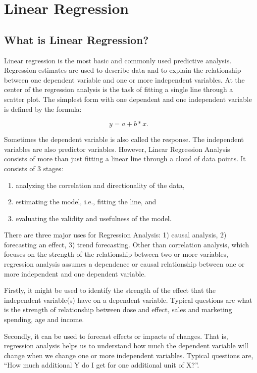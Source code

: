 \documentclass{article}\usepackage[]{graphicx}\usepackage[]{color}
\begin{document}
\section{Linear Regression}

\subsection{What is Linear Regression?}

Linear regression is the most basic and commonly used predictive analysis.  Regression estimates are used to describe data and to explain the relationship between one dependent variable and one or more independent variables.  At the center of the regression analysis is the task of fitting a single line through a scatter plot.  The simplest form with one dependent and one independent variable is defined by the formula:

\begin{equation}
y = a + b*x.
\end{equation}

Sometimes the dependent variable is also called the response.  The independent variables are also predictor variables.  However, Linear Regression Analysis consists of more than just fitting a linear line through a cloud of data points.  It consists of 3 stages:

\begin{enumerate}
  \item analyzing the correlation and directionality of the data, 
  \item estimating the model, i.e., fitting the line, and 
  \item evaluating the validity and usefulness of the model.
\end{enumerate}

There are three major uses for Regression Analysis: 1) causal analysis, 2) forecasting an effect, 3) trend forecasting.  Other than correlation analysis, which focuses on the strength of the relationship between two or more variables, regression analysis assumes a dependence or causal relationship between one or more independent and one dependent variable.

Firstly, it might be used to identify the strength of the effect that the independent variable(s) have on a dependent variable.  Typical questions are what is the strength of relationship between dose and effect, sales and marketing spending, age and income.

Secondly, it can be used to forecast effects or impacts of changes.  That is, regression analysis helps us to understand how much the dependent variable will change when we change one or more independent variables.  Typical questions are, “How much additional Y do I get for one additional unit of X?”.
\end{document}
